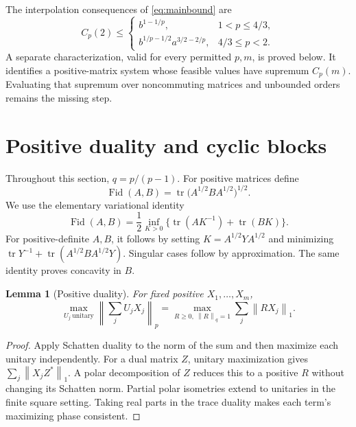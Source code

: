 \documentclass[11pt]{article}
\newcommand{\tr}{\operatorname{tr}}
\newcommand{\Fid}{\operatorname{Fid}}
\newcommand{\norm}[1]{\left\lVert#1\right\rVert}
\newtheorem{lemma}[theorem]{Lemma}
\theoremstyle{remark}\newtheorem{remark}[theorem]{Remark}
\begin{document}
The interpolation consequences of \eqref{eq:mainbound} are
\begin{equation}\label{eq:allp}
 C_p(2)\le
 \begin{cases}
 b^{1-1/p},&1<p\le4/3,\\
 b^{1/p-1/2}a^{3/2-2/p},&4/3\le p<2.
 \end{cases}
\end{equation}
A separate characterization, valid for every permitted \(p,m\), is proved below. It identifies a positive-matrix system whose feasible values have supremum \(C_p(m)\). Evaluating that supremum over noncommuting matrices and unbounded orders remains the missing step.

\section{Positive duality and cyclic blocks}
Throughout this section, \(q=p/(p-1)\). For positive matrices define
\[
 \Fid(A,B)=\tr\bigl(A^{1/2}BA^{1/2}\bigr)^{1/2}.
\]
We use the elementary variational identity
\begin{equation}\label{eq:fidelity}
 \Fid(A,B)=\frac12\inf_{K>0}\bigl\{\tr(AK^{-1})+\tr(BK)\bigr\}.
\end{equation}
For positive-definite \(A,B\), it follows by setting \(K=A^{1/2}YA^{1/2}\) and minimizing \(\tr Y^{-1}+\tr(A^{1/2}BA^{1/2}Y)\). Singular cases follow by approximation. The same identity proves concavity in \(B\).

\begin{lemma}[Positive duality]\label{lem:duality}
For fixed positive \(X_1,\ldots,X_m\),
\[
 \max_{U_j\ \mathrm{unitary}}\norm{\sum_jU_jX_j}_p
 =\max_{R\ge0,\ \norm R_q=1}\sum_j\norm{RX_j}_1.
\]
\end{lemma}
\begin{proof}
Apply Schatten duality to the norm of the sum and then maximize each unitary independently. For a dual matrix \(Z\), unitary maximization gives \(\sum_j\norm{X_jZ^*}_1\). A polar decomposition of \(Z\) reduces this to a positive \(R\) without changing its Schatten norm. Partial polar isometries extend to unitaries in the finite square setting. Taking real parts in the trace duality makes each term's maximizing phase consistent.
\end{proof}
\end{document}
